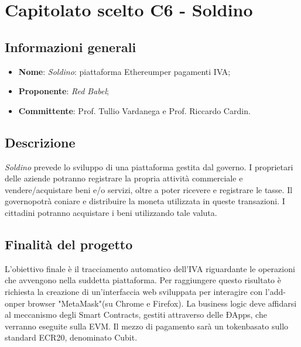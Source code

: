 \section{Capitolato scelto C6 - Soldino}
\subsection{Informazioni generali}
% 
\begin{itemize}
\item \textbf{Nome}: \textit{Soldino}: piattaforma Ethereum\glosp per pagamenti IVA;
\item \textbf{Proponente}: \textit{Red Babel};
\item \textbf{Committente}: Prof. Tullio Vardanega e Prof. Riccardo Cardin.
\end{itemize}

\subsection{Descrizione}
\textit{Soldino} prevede lo sviluppo di una piattaforma gestita dal governo\glo. I proprietari delle aziende potranno registrare la propria attività commerciale e vendere/acquistare beni e/o servizi, oltre a poter ricevere e registrare le tasse. Il governo\glosp potrà coniare e distribuire la moneta utilizzata in queste transazioni. I cittadini potranno acquistare i beni utilizzando tale valuta.

\subsection{Finalità del progetto}
L'obiettivo finale è il tracciamento automatico dell'IVA riguardante le operazioni che avvengono nella suddetta piattaforma. Per raggiungere questo risultato è richiesta la creazione di un'interfaccia web sviluppata per interagire con l'add-on\glosp per browser "MetaMask"\glosp (su Chrome e Firefox). La business logic deve affidarsi al meccanismo degli Smart Contracts\glo, gestiti attraverso delle ÐApps\glo, che verranno eseguite sulla EVM\glo. Il mezzo di pagamento sarà un token\glosp basato sullo standard ECR20\glo, denominato Cubit\glo. 


